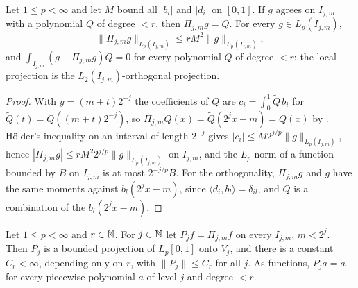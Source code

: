 \begin{lemma}
\label{lem:loc-proj}
\leanok
{}
Let $1 \leq p < \infty$ and let $M$ bound all $|b_i|$ and $|d_i|$ on $[0, 1]$. If $g$ agrees on
$I_{j,m}$ with a polynomial $Q$ of degree $< r$, then $\Pi_{j,m} g = Q$. For every
$g \in L_p(I_{j,m})$,
\[
  \|\Pi_{j,m} g\|_{L_p(I_{j,m})} \leq r M^2 \|g\|_{L_p(I_{j,m})} ,
\]
and $\int_{I_{j,m}} (g - \Pi_{j,m} g) Q = 0$ for every polynomial $Q$ of degree $< r$: the local
projection is the $L_2(I_{j,m})$-orthogonal projection.
\end{lemma}

\begin{proof}
\leanok
With $y = (m + t) 2^{-j}$ the coefficients of $Q$ are $c_i = \int_0^1 \tilde Q \, b_i$ for
$\tilde Q(t) = Q((m + t) 2^{-j})$, so $\Pi_{j,m} Q(x) = \tilde Q(2^j x - m) = Q(x)$ by
. Hölder's inequality on an interval of length $2^{-j}$ gives
$|c_i| \leq M 2^{j/p} \|g\|_{L_p(I_{j,m})}$, hence
$|\Pi_{j,m} g| \leq r M^2 2^{j/p} \|g\|_{L_p(I_{j,m})}$ on $I_{j,m}$, and the $L_p$ norm of a
function bounded by $B$ on $I_{j,m}$ is at most $2^{-j/p} B$. For the orthogonality, $\Pi_{j,m} g$
and $g$ have the same moments against $b_l(2^j x - m)$, since
$\langle d_i, b_l \rangle = \delta_{il}$, and $Q$ is a combination of the $b_l(2^j x - m)$.
\end{proof}

\begin{theorem}
\label{thm:pp-proj}
\leanok
{}
Let $1 \leq p < \infty$ and $r \in \mathbb{N}$. For $j \in \mathbb{N}$ let $P_j f = \Pi_{j,m} f$ on every
$I_{j,m}$, $m < 2^j$. Then $P_j$ is a bounded projection of $L_p[0,1]$ onto $V_j$, and there is a
constant $C_r < \infty$, depending only on $r$, with $\|P_j\| \leq C_r$ for all $j$. As
functions, $P_j a = a$ for every piecewise polynomial $a$ of level $j$ and degree $< r$.
\end{theorem}

